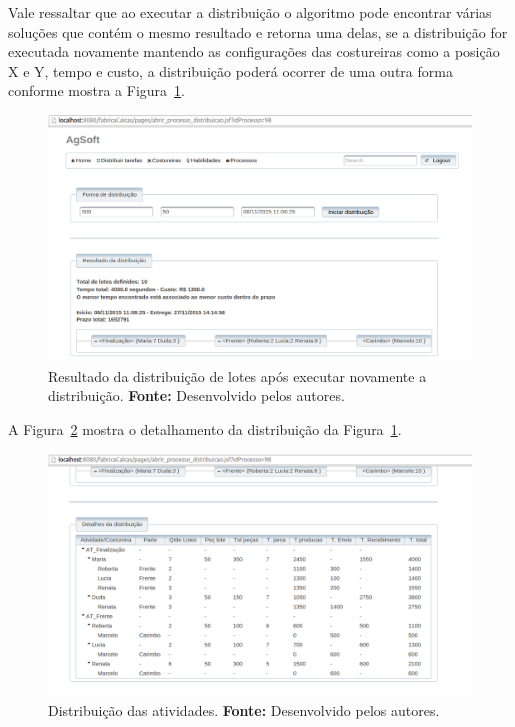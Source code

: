\par Vale ressaltar que ao executar a distribuição o algoritmo pode
encontrar várias soluções que contém o mesmo resultado e retorna uma delas, se a
distribuição for executada novamente mantendo as configurações das costureiras
como a posição X e Y, tempo e custo, a distribuição poderá ocorrer de uma outra
forma conforme mostra a Figura~\ref{fig:resultado2_teste5}.



\begin{figure}[h!]
	\centerline{\includegraphics[scale=0.3]{./imagens/resultado2_teste5.png}}
	\caption[Resultado da distribuição de lotes após executar novamente a
	distribuição.]
	{Resultado da distribuição de lotes após executar novamente a
	distribuição. \textbf{Fonte:} Desenvolvido pelos autores.}
	\label{fig:resultado2_teste5}
\end{figure}


\par A Figura~\ref{fig:detalhamento2_teste5} mostra o detalhamento da
distribuição da Figura~\ref{fig:resultado2_teste5}.

\newpage

\begin{figure}[h!]
	\centerline{\includegraphics[scale=0.3]{./imagens/detalhamento2_teste5.png}}
	\caption[Distribuição das atividades.] 
	{Distribuição das atividades. \textbf{Fonte:} Desenvolvido pelos
	autores.}
	\label{fig:detalhamento2_teste5}
\end{figure}


